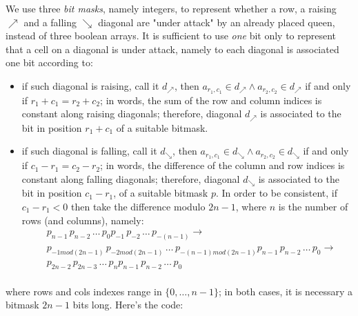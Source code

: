 We use three \textit{bit masks}, namely integers, to
represent whether a row, a raising $\nearrow$ and a falling $\searrow$ diagonal
are "under attack" by an already placed queen, instead of three boolean arrays.
It is sufficient to use \textit{one} bit only to represent that a cell on a diagonal
is under attack, namely to each diagonal is associated one bit according to:
\begin{itemize}
\item if such diagonal is raising, call it $d_\nearrow$, then $a_{r_{1}, c_{1}}\in
  d_\nearrow \wedge a_{r_{2}, c_{2}} \in d_\nearrow$ if and only if
  $r_{1}+c_{1}=r_{2}+c_{2}$; in words, the sum of the row and column indices is
  constant along raising diagonals; therefore, diagonal $d_\nearrow$ is
  associated to the bit in position $r_{1}+c_{1}$ of a suitable bitmask.
\item if such diagonal is falling, call it $d_\searrow$, then $a_{r_{1},
  c_{1}}\in d_\searrow \wedge a_{r_{2}, c_{2}} \in d_\searrow$ if and only if
  $c_{1}-r_{1}=c_{2}-r_{2}$; in words, the difference of the column and row
  indices is constant along falling diagonals; therefore, diagonal $d_\searrow$
  is associated to the bit in position  $c_{1}-r_{1}$, of a suitable bitmask $p$.
  In order to be consistent, if $c_{1}-r_{1} < 0$ then take the difference modulo
  $2n-1$, where $n$ is the number of rows (and columns), namely:
  \begin{displaymath}
  \begin{split}
  &p_{n-1}\,p_{n-2}\,\ldots\,p_{0}p_{-1}\,p_{-2}\,\ldots\,p_{-(n-1)} \rightarrow \\
  &p_{-1 mod(2n-1)}\,p_{-2 mod(2n-1)}\,\ldots\,p_{-(n-1) mod(2n-1)}p_{n-1}\,p_{n-2}\,\ldots\,p_{0} \rightarrow \\
  &p_{2n-2}\,p_{2n-3}\,\ldots\,p_{n}p_{n-1}\,p_{n-2}\,\ldots\,p_{0}\\
  \end{split}
  \end{displaymath}
\end{itemize}
where rows and cols indexes range in $\lbrace 0,\ldots,n-1 \rbrace$; in both
cases, it is necessary a bitmask $2n-1$ bits long. Here's the code:
\newpage
\inputminted[fontsize=\small,firstline=3,lastline=33]{python}{backtracking/queens.py}

